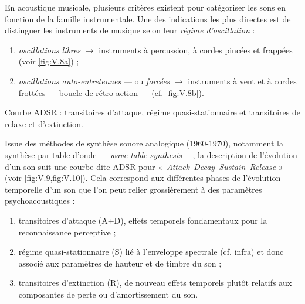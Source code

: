 En acoustique musicale, plusieurs critères existent pour catégoriser les sons en fonction de la famille instrumentale. 
Une des indications les plus directes est de distinguer les instruments de musique selon leur \emph{régime d'oscillation} :
\begin{enumerate}
\item \emph{oscillations libres} $\rightarrow$ instruments à percussion, à cordes pincées et frappées (voir \cref{fig:V.8a}) ;
\item \emph{oscillations auto-entretenues} --- ou \emph{forcées} $\rightarrow$ instruments à vent et à cordes frottées --- boucle de rétro-action --- (cf. \cref{fig:V.8b}).
\end{enumerate}

\begin{marginfigure}%
\caption{\label{fig:V.9}Courbe ADSR : transitoires d'attaque, régime quasi-stationnaire et transitoires de relaxe et d'extinction.}
\end{marginfigure}

Issue des méthodes de synthèse sonore analogique (1960-1970), notamment la synthèse par table d'onde --- \textit{wave-table synthesis} ---, la description de l'évo\-lution d'un son suit une courbe dite ADSR pour «~\textit{Attack--Decay--Sustain--Release} » (voir \cref{fig:V.9,fig:V.10}). Cela correspond aux différentes phases de l'évolution temporelle d'un son que l'on peut relier grossièrement à des paramètres psychoacoustiques :
\begin{enumerate}
\item transitoires d'attaque (A+D), effets temporels fondamentaux pour la reconnaissance perceptive ;
\item régime quasi-stationnaire (S) lié à l'enveloppe spectrale (cf. infra) et donc associé aux paramètres de hauteur et de timbre du son ;
\item transitoires d'extinction (R), de nouveau effets temporels plutôt relatifs aux composantes de perte ou d'amortissement du son.
\end{enumerate}

